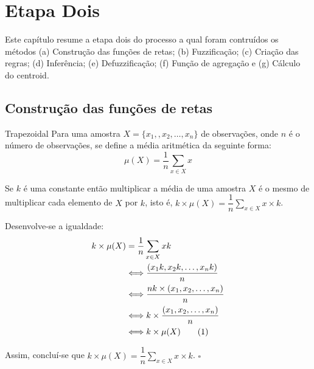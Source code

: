 \documentclass[courier]{uninove-ppgi}
\newcommand{\numberequation}[1]{\addtocounter{equation}{#1}\tag{\theequation}}
\begin{document}
	
	\chapter{Etapa Dois}
    
        \begin{resumocapitulo}
            Este capítulo resume a etapa dois do processo a qual foram contruídos os métodos (a) Construção das funções de retas; (b) Fuzzificação; (c) Criação das regras; (d) Inferência; (e) Defuzzificação; (f) Função de agregação e (g) Cálculo do centroid.
        \end{resumocapitulo}
		
		\section{Construção das funções de retas}
		
			 
			  \begin{Cálculo de reta}{Trapezoidal}
              Para uma amostra $ X=\{x_1,, x_2, \ldots,x_n\} $ de observações, onde $ n $ é o número de observações, se define a média aritmética da seguinte forma:
              \begin{equation}
              \mu(X)=\dfrac{1}{n}\sum\limits_{x \in X}x
              \end{equation}
              \end{Cálculo de reta}
              \begin{proposicao}
              Se $ k $ é uma constante então multiplicar a média de uma amostra $ X $ é o mesmo de multiplicar cada elemento de $ X $ por $ k $, isto é, $ k \times \mu(X) = \dfrac{1}{n} \sum\limits_{x \in X}x\times k $.
              \end{proposicao}
              \begin{prova}
              Desenvolve-se a igualdade:
              \begin{align*}
              k \times \mu(X) &= \dfrac{1}{n} \sum\limits_{x \in X}xk \\
              & \Longleftrightarrow  \dfrac{(x_1k,x_2k, \ldots, x_nk)}{n} \\
              & \Longleftrightarrow  \dfrac{nk \times (x_1,x_2, \ldots, x_n)}{n} \\
              & \Longleftrightarrow   k \times \dfrac{(x_1,x_2, \ldots, x_n)}{n} \\
              & \Longleftrightarrow   k \times \mu(X) \numberequation{1}
              \end{align*}
              \end{prova}
              Assim, concluí-se que $ k \times \mu(X) = \dfrac{1}{n} \sum\limits_{x \in X}x\times k $. $ \square $
			
\end{document}
